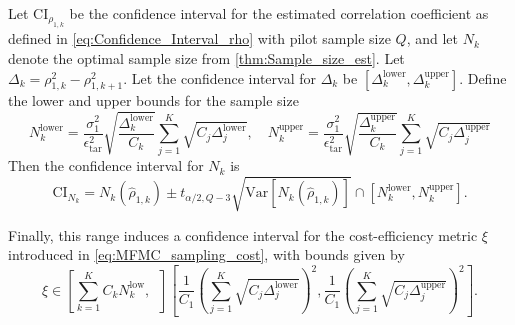 %
\begin{theorem}
\label{thm:Sample_size_est_conf_interval} 
Let $\text{CI}_{\rho_{1,k}}$ be the confidence interval for the estimated correlation coefficient as defined in \eqref{eq:Confidence_Interval_rho} with pilot sample size $Q$, and let $N_k$ denote the optimal sample size from \eqref{thm:Sample_size_est}. Let
$\Delta_k = \rho_{1,k}^2 - \rho_{1,k+1}^2.$ Let the confidence interval for $\Delta_k$ be $\left[\Delta_k^{\text{lower}},\Delta_k^{\text{upper}}\right]$. Define the lower and upper bounds for the sample size
%
\begin{equation}\label{eq:upper_lower_N_k}
    N_k^{\text{lower}} = \frac{\sigma_1^2}{\epsilon_{\text{tar}}^2}\sqrt{\frac{\Delta_k^{\text{lower}}}{C_k}}\sum_{j=1}^K\sqrt{C_j\Delta_j^{\text{lower}}},\quad N_k^{\text{upper}} = \frac{\sigma_1^2}{\epsilon_{\text{tar}}^2}\sqrt{\frac{\Delta_k^{\text{upper}}}{C_k}}\sum_{j=1}^K\sqrt{C_j\Delta_j^{\text{upper}}}
\end{equation}
%
Then the confidence interval for $N_k$ is
%
\[
\text{CI}_{N_k} = N_k\left(\widehat\rho_{1,k}\right)\pm t_{\alpha/2,Q-3}\sqrt{\text{Var}\left[N_k\left(\widehat\rho_{1,k}\right)\right]}\cap \left[N_k^{\text{lower}}, N_k^{\text{upper}}\right].
\]
%
\end{theorem}



Finally, this range induces a confidence interval for the cost-efficiency metric $\xi$ introduced in \eqref{eq:MFMC_sampling_cost}, with bounds given by
%
\begin{equation}\label{eq:MFMC_sampling_cost_efficiency_CI}
    \xi \in  \left[\sum_{k=1}^K C_k N_k^{\text{low}},\;\; \right]\left[\frac{1}{C_1} \left(\sum_{j=1}^K\sqrt{C_j\Delta_j^{\text{lower}}}\right)^2,\frac{1}{C_1} \left(\sum_{j=1}^K\sqrt{C_j\Delta_j^{\text{upper}}}\right)^2\right].
\end{equation}
%

